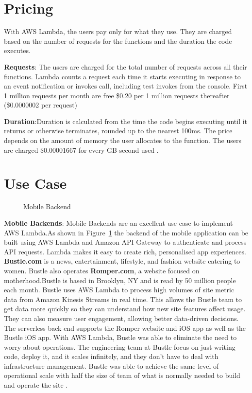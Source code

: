 \documentclass[9pt,twocolumn,twoside]{../../styles/osajnl}
\begin{document}
\section{Pricing}
With AWS Lambda, the users pay only for what they use. They are charged based 
on the number of requests for the functions and the duration the code executes. 

\textbf{Requests}: The users are charged for the total number of requests 
across all their functions. Lambda counts a request each time it starts 
executing in response to an event notification or invokes call, including test 
invokes from the console. First 1 million requests per month are free
\$0.20 per 1 million requests thereafter (\$0.0000002 per request)

\textbf{Duration}:Duration is calculated from the time the code begins 
executing until it returns or otherwise terminates, rounded up to the nearest 
100ms. The price depends on the amount of memory the user allocates to the 
function. The users are charged \$0.00001667 for every GB-second used 
\cite{www-AWSLambdaPricing}.

\section{Use Case}



\renewcommand{\labelitemi}{\scriptsize$\bullet$} 
\begin{figure}[H]
\centering
\graphicspath{ {images/} }
\caption{Mobile Backend} \cite{www-AWSLambda}
\label{fig:usecase1}
\end{figure}

\textbf{Mobile Backends}: Mobile Backends are an excellent use case to 
implement AWS Lambda.As shown in Figure~\ref{fig:usecase1} the backend of the mobile application 
can be built using AWS Lambda and Amazon API Gateway to authenticate and 
process API requests. Lambda makes it easy to create rich, personalised app 
experiences.
\textbf{Bustle.com} is a news, entertainment, lifestyle, and fashion website 
catering to women. Bustle also operates \textbf{Romper.com}, a website focused 
on motherhood.Bustle is based in Brooklyn, NY and is read by 50 million people 
each month. Bustle uses AWS Lambda to process high volumes of site metric data 
from Amazon Kinesis Streams \cite{www-AWSKinesis} in real time. This allows the 
Bustle team to get data more quickly so they can understand how new site 
features affect usage. They can also measure user engagement, allowing better 
data-driven decisions. The serverless back end supports the Romper website and 
iOS app as well as the Bustle iOS app. With AWS Lambda, Bustle was able to 
eliminate the need to worry about operations. The engineering team at Bustle 
focus on just writing code, deploy it, and it scales infinitely, and they don't 
have to deal with infrastructure management. Bustle was able to achieve the 
same level of operational scale with half the size of team of what is normally 
needed to build and operate the site  \cite{www-AWSLambdaBustle}.
\end{document}

